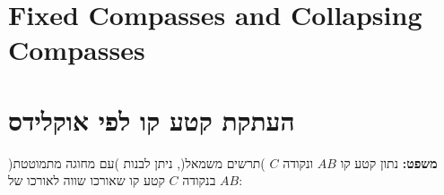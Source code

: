 
\section{Fixed Compasses and Collapsing Compasses}\label{s.collapse}



\section{העתקת קטע קו לפי אוקלידס}\label{s.collapse-copy}

\textbf{משפט:}
נתון קטע קו
$AB$
ונקודה
$C$
)תרשים משמאל(, ניתן לבנות )עם מחוגה מתמוטטת( בנקודה
$C$
קטע קו שאורכו שווה לאורכו של 
$AB$:



